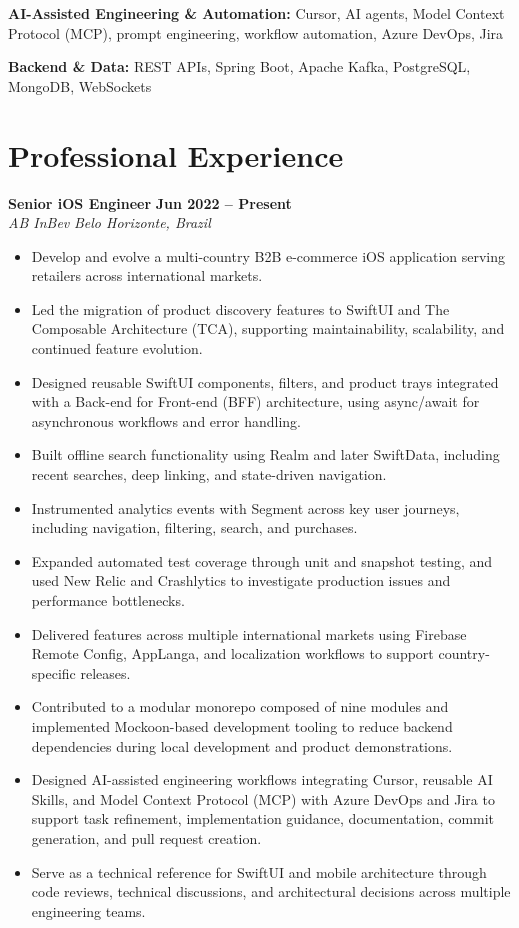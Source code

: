 \documentclass[10pt,a4paper]{article}
\newcommand{\job}[4]{%
    \textbf{#1} \hfill \textbf{#2}\\
    \textit{#3} \hfill \textit{#4}\\[-2pt]
}
\begin{document}
\textbf{AI-Assisted Engineering \& Automation:}
Cursor, AI agents, Model Context Protocol (MCP), prompt engineering, workflow automation, Azure DevOps, Jira

\textbf{Backend \& Data:}
REST APIs, Spring Boot, Apache Kafka, PostgreSQL, MongoDB, WebSockets


\section{Professional Experience}

\job{Senior iOS Engineer}{Jun 2022 -- Present}{AB InBev}{Belo Horizonte, Brazil}

\begin{itemize}
    \item Develop and evolve a multi-country B2B e-commerce iOS application serving retailers across international markets.
    \item Led the migration of product discovery features to SwiftUI and The Composable Architecture (TCA), supporting maintainability, scalability, and continued feature evolution.
    \item Designed reusable SwiftUI components, filters, and product trays integrated with a Back-end for Front-end (BFF) architecture, using async/await for asynchronous workflows and error handling.
    \item Built offline search functionality using Realm and later SwiftData, including recent searches, deep linking, and state-driven navigation.
    \item Instrumented analytics events with Segment across key user journeys, including navigation, filtering, search, and purchases.
    \item Expanded automated test coverage through unit and snapshot testing, and used New Relic and Crashlytics to investigate production issues and performance bottlenecks.
    \item Delivered features across multiple international markets using Firebase Remote Config, AppLanga, and localization workflows to support country-specific releases.
    \item Contributed to a modular monorepo composed of nine modules and implemented Mockoon-based development tooling to reduce backend dependencies during local development and product demonstrations.
    \item Designed AI-assisted engineering workflows integrating Cursor, reusable AI Skills, and Model Context Protocol (MCP) with Azure DevOps and Jira to support task refinement, implementation guidance, documentation, commit generation, and pull request creation.
    \item Serve as a technical reference for SwiftUI and mobile architecture through code reviews, technical discussions, and architectural decisions across multiple engineering teams.
\end{itemize}
\end{document}

